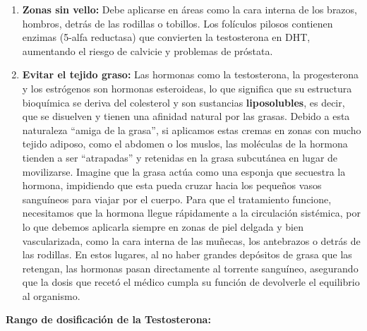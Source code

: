 \documentclass[
  spanish,
]{article}
\begin{document}
\begin{enumerate}
\def\labelenumi{\arabic{enumi}.}
\item
  \textbf{Zonas sin vello:} Debe aplicarse en áreas como la cara interna de los brazos, hombros, detrás de las rodillas o tobillos. Los folículos pilosos contienen enzimas (5-alfa reductasa) que convierten la testosterona en DHT, aumentando el riesgo de calvicie y problemas de próstata.
\item
  \textbf{Evitar el tejido graso:}
  Las hormonas como la testosterona, la progesterona y los estrógenos son hormonas esteroideas, lo que significa que su estructura bioquímica se deriva del colesterol y son sustancias \textbf{liposolubles}, es decir, que se disuelven y tienen una afinidad natural por las grasas. Debido a esta naturaleza ``amiga de la grasa'', si aplicamos estas cremas en zonas con mucho tejido adiposo, como el abdomen o los muslos, las moléculas de la hormona tienden a ser ``atrapadas'' y retenidas en la grasa subcutánea en lugar de movilizarse. Imagine que la grasa actúa como una esponja que secuestra la hormona, impidiendo que esta pueda cruzar hacia los pequeños vasos sanguíneos para viajar por el cuerpo. Para que el tratamiento funcione, necesitamos que la hormona llegue rápidamente a la circulación sistémica, por lo que debemos aplicarla siempre en zonas de piel delgada y bien vascularizada, como la cara interna de las muñecas, los antebrazos o detrás de las rodillas. En estos lugares, al no haber grandes depósitos de grasa que las retengan, las hormonas pasan directamente al torrente sanguíneo, asegurando que la dosis que recetó el médico cumpla su función de devolverle el equilibrio al organismo.
\end{enumerate}

\textbf{Rango de dosificación de la Testosterona:}
\end{document}
